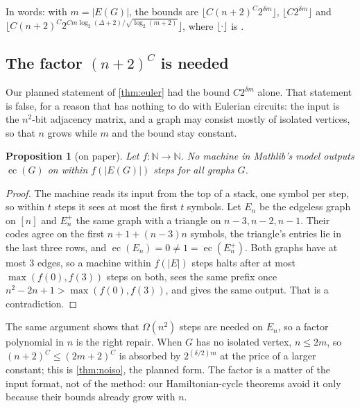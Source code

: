 \documentclass[10pt]{amsart}
\theoremstyle{plain}
\newtheorem{proposition}[theorem]{Proposition}
\theoremstyle{definition}
\theoremstyle{remark}
\numberwithin{equation}{section}
\newcommand{\N}{\mathbb{N}}
\newcommand{\EC}{\operatorname{ec}}
\begin{document}
\noindent In words: with $m=|E(G)|$, the bounds are $\lfloor C(n+2)^C2^{\delta m}\rfloor$,
$\lfloor C2^{\delta m}\rfloor$ and
$\lfloor C(n+2)^C2^{Cm\log_2(\Delta+2)/\sqrt{\log_2(m+2)}}\rfloor$, where $\lfloor\cdot\rfloor$ is
.

\subsection{The factor \texorpdfstring{$(n+2)^C$}{(n+2)\^{}C} is needed}
Our planned statement of \cref{thm:euler} had the bound $C2^{\delta m}$ alone. That statement is
false, for a reason that has nothing to do with Eulerian circuits: the input is the $n^2$-bit
adjacency matrix, and a graph may consist mostly of isolated vertices, so that $n$ grows while $m$ and
the bound stay constant.

\begin{proposition}[on paper]\label{prop:lower}
Let $f\colon\N\to\N$. No machine in Mathlib's  model outputs  $\EC(G)$ on
 within $f(|E(G)|)$ steps for all graphs $G$.
\end{proposition}

\begin{proof}
The machine reads its input from the top of a stack, one symbol per step, so within $t$ steps it sees
at most the first $t$ symbols. Let $E_n$ be the edgeless graph on $[n]$ and $E_n^+$ the same graph with
a triangle on $n-3,n-2,n-1$. Their codes agree on the first $n+1+(n-3)n$ symbols, the triangle's
entries lie in the last three rows, and $\EC(E_n)=0\ne1=\EC(E_n^+)$. Both graphs have at most $3$
edges, so a machine within $f(|E|)$ steps halts after at most $\max(f(0),f(3))$ steps on both, sees
the same prefix once $n^2-2n+1>\max(f(0),f(3))$, and gives the same output. That is a contradiction.
\end{proof}

\noindent The same argument shows that $\Omega(n^2)$ steps are needed on $E_n$, so a factor
polynomial in $n$ is the right repair. When $G$ has no isolated vertex, $n\le2m$, so $(n+2)^C\le
(2m+2)^C$ is absorbed by $2^{(\delta/2)m}$ at the price of a larger constant; this is
\cref{thm:noiso}, the planned form. The factor is a matter of the input format, not of the method:
our Hamiltonian-cycle theorems avoid it only because their bounds already grow with $n$.
\end{document}
